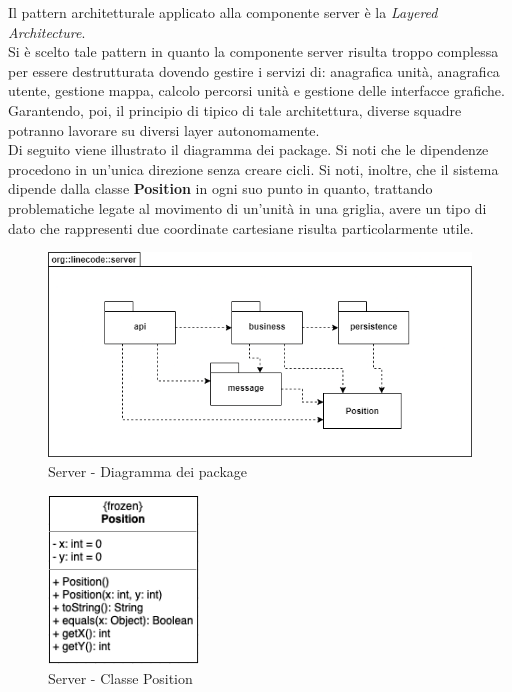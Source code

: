 Il pattern architetturale applicato alla componente server è la \textit{Layered Architecture}. \\
Si è scelto tale pattern in quanto la componente server risulta troppo complessa per essere destrutturata dovendo gestire i servizi di: anagrafica unità, anagrafica utente, gestione mappa, calcolo percorsi unità e gestione delle interfacce grafiche. Garantendo, poi, il principio di  tipico di tale architettura, diverse squadre potranno lavorare su diversi layer autonomamente.\\
Di seguito viene illustrato il diagramma dei package. Si noti che le dipendenze procedono in un'unica direzione senza creare cicli. Si noti, inoltre, che il sistema dipende dalla classe \textbf{Position} in ogni suo punto in quanto, trattando problematiche legate al movimento di un'unità in una griglia, avere un tipo di dato che rappresenti due coordinate cartesiane risulta particolarmente utile.

\begin{figure}[H]
	\centering
	\includegraphics[width=12cm]{img/server_package.png}
	\caption{Server - Diagramma dei package}
\end{figure}

\begin{figure}[H]
    \centering
    \includegraphics[width=4cm]{img/class_position.png}
    \caption{Server - Classe Position}
\end{figure}

